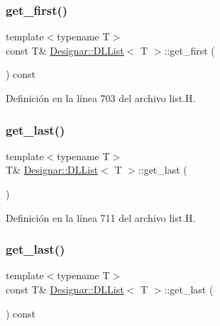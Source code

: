 \subsubsection{\texorpdfstring{get\+\_\+first()}{get\_first()}\hspace{0.1cm}{\footnotesize\ttfamily [2/2]}}
{\footnotesize\ttfamily template$<$typename T$>$ \\
const T\& \hyperlink{class_designar_1_1_d_l_list}{Designar\+::\+D\+L\+List}$<$ T $>$\+::get\+\_\+first (\begin{DoxyParamCaption}{ }\end{DoxyParamCaption}) const\hspace{0.3cm}{\ttfamily [inline]}}



Definición en la línea 703 del archivo list.\+H.

\mbox{\label{class_designar_1_1_d_l_list_a94c9be82f4ec5a3579e84027c421e073}} 
\subsubsection{\texorpdfstring{get\+\_\+last()}{get\_last()}\hspace{0.1cm}{\footnotesize\ttfamily [1/2]}}
{\footnotesize\ttfamily template$<$typename T$>$ \\
T\& \hyperlink{class_designar_1_1_d_l_list}{Designar\+::\+D\+L\+List}$<$ T $>$\+::get\+\_\+last (\begin{DoxyParamCaption}{ }\end{DoxyParamCaption})\hspace{0.3cm}{\ttfamily [inline]}}



Definición en la línea 711 del archivo list.\+H.

\mbox{\label{class_designar_1_1_d_l_list_aae2cd78c744f82ece725c9d21a02d4da}} 
\subsubsection{\texorpdfstring{get\+\_\+last()}{get\_last()}\hspace{0.1cm}{\footnotesize\ttfamily [2/2]}}
{\footnotesize\ttfamily template$<$typename T$>$ \\
const T\& \hyperlink{class_designar_1_1_d_l_list}{Designar\+::\+D\+L\+List}$<$ T $>$\+::get\+\_\+last (\begin{DoxyParamCaption}{ }\end{DoxyParamCaption}) const\hspace{0.3cm}{\ttfamily [inline]}}



